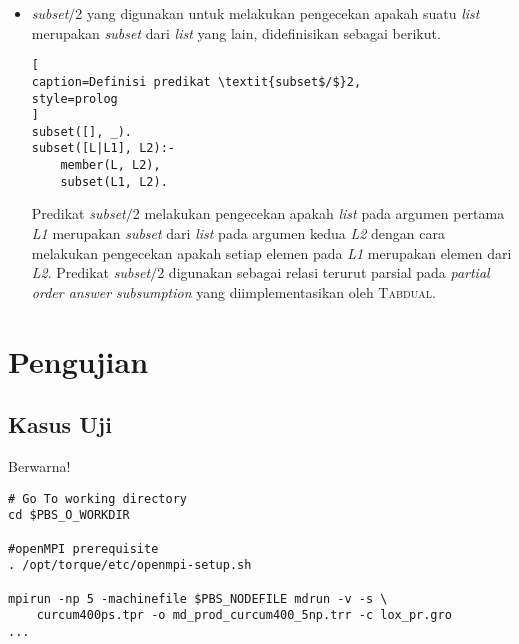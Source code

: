 \begin{itemize}
	Predikat \textit{get\_abducibles$/$}1 cukup melakukan unifikasi argumennya, \textit{A}, dengan \textit{list abducible} yang sudah tersimpan pada \textit{database}. Jika \textit{abducible} tidak ditemukan, maka \textit{get\_abducibles$/$}1 memberikan \textit{list} kosong.
	
	\item \label{subset} \textit{subset$/$}2 yang digunakan untuk melakukan pengecekan apakah suatu \textit{list} merupakan \textit{subset} dari \textit{list} yang lain, didefinisikan sebagai berikut.
	\\
	
\begin{lstlisting}[
caption=Definisi predikat \textit{subset$/$}2,
style=prolog
]
subset([], _).
subset([L|L1], L2):-
	member(L, L2),
	subset(L1, L2).
\end{lstlisting}
	
	Predikat \textit{subset$/$}2 melakukan pengecekan apakah \textit{list} pada argumen pertama \textit{L1} merupakan \textit{subset} dari \textit{list} pada argumen kedua \textit{L2} dengan cara melakukan pengecekan apakah setiap elemen pada \textit{L1} merupakan elemen dari \textit{L2}. Predikat \textit{subset$/$}2 digunakan sebagai relasi terurut parsial pada \textit{partial order answer subsumption} yang diimplementasikan oleh \textsc{Tabdual}.
	
\end{itemize}
\section{Pengujian} %

\subsection{Kasus Uji}
Berwarna!
\begin{lstlisting}[caption=Potongan skrip submisi \f{job} melalui torqace,label={lst:grotorqace},style=shell]
# Go To working directory
cd $PBS_O_WORKDIR

#openMPI prerequisite
. /opt/torque/etc/openmpi-setup.sh

mpirun -np 5 -machinefile $PBS_NODEFILE mdrun -v -s \ 
	curcum400ps.tpr -o md_prod_curcum400_5np.trr -c lox_pr.gro
...
\end{lstlisting}
